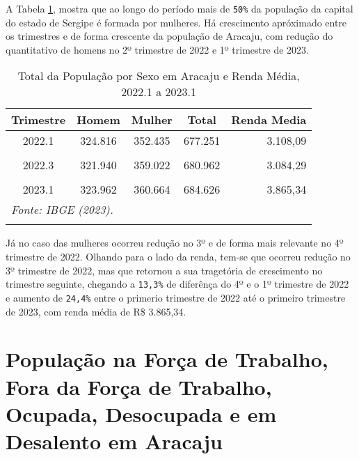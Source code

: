 \documentclass[preprint, 3p,
authoryear]{elsarticle} %
\begin{document}
A Tabela \ref{tab1}, mostra que ao longo do período mais de
\texttt{50\%} da população da capital do estado de Sergipe é formada por
mulheres. Há crescimento apróximado entre os trimestres e de forma
crescente da população de Aracaju, com redução do quantitativo de homens
no 2º trimestre de 2022 e 1º trimestre de 2023. \newpage
\begingroup\fontsize{9}{11}\selectfont

\begin{longtable}[t]{ccccr}
\caption{\label{tab:tab1}\label{tab1}Total da População por Sexo em Aracaju e Renda Média, 
2022.1 a 2023.1}\\
\toprule
Trimestre & Homem & Mulher & Total & Renda Media\\
\midrule
2022.1 & 324.816 & 352.435 & 677.251 & 3.108,09\\
\cellcolor[HTML]{DCDCDC}{2022.2} & \cellcolor[HTML]{DCDCDC}{319.497} & \cellcolor[HTML]{DCDCDC}{359.615} & \cellcolor[HTML]{DCDCDC}{679.112} & \cellcolor[HTML]{DCDCDC}{3.136,40}\\
2022.3 & 321.940 & 359.022 & 680.962 & 3.084,29\\
\cellcolor[HTML]{DCDCDC}{2022.4} & \cellcolor[HTML]{DCDCDC}{325.904} & \cellcolor[HTML]{DCDCDC}{356.896} & \cellcolor[HTML]{DCDCDC}{682.800} & \cellcolor[HTML]{DCDCDC}{3.521,83}\\
2023.1 & 323.962 & 360.664 & 684.626 & 3.865,34\\
\bottomrule
\multicolumn{5}{l}{\rule{0pt}{1em}\textit{Fonte: IBGE (2023).}}\\
\multicolumn{5}{l}{\rule{0pt}{1em}}\\
\end{longtable}
\endgroup{}

Já no caso das mulheres ocorreu redução no 3º e de forma mais relevante
no 4º trimestre de 2022. Olhando para o lado da renda, tem-se que
ocorreu redução no 3º trimestre de 2022, mas que retornou a sua
tragetória de crescimento no trimestre seguinte, chegando a
\texttt{13,3\%} de diferênça do 4º e o 1º trimestre de 2022 e aumento de
\texttt{24,4\%} entre o primerio trimestre de 2022 até o primeiro
trimestre de 2023, com renda média de R\$ 3.865,34.

\hypertarget{populauxe7uxe3o-na-foruxe7a-de-trabalho-fora-da-foruxe7a-de-trabalho-ocupada-desocupada-e-em-desalento-em-aracaju}{%
\section{População na Força de Trabalho, Fora da Força de Trabalho,
Ocupada, Desocupada e em Desalento em
Aracaju}\label{populauxe7uxe3o-na-foruxe7a-de-trabalho-fora-da-foruxe7a-de-trabalho-ocupada-desocupada-e-em-desalento-em-aracaju}}
\end{document}
